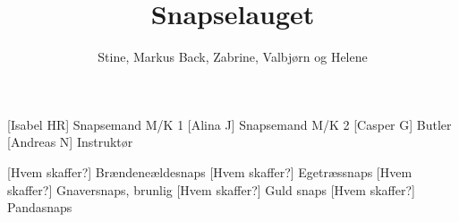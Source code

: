 \documentclass[a4paper,12pt]{article}
\title{Snapselauget}
\author{Stine, Markus Back, Zabrine, Valbjørn og Helene}
\begin{document}
\maketitle




\begin{roles}
	[Isabel HR] Snapsemand M/K 1
	[Alina J] Snapsemand M/K 2
	[Casper G] Butler
	[Andreas N] Instruktør
\end{roles}


\begin{props}
	[Hvem skaffer?] Brændeneældesnaps
	[Hvem skaffer?] Egetræssnaps
	[Hvem skaffer?] Gnaversnaps, brunlig
	[Hvem skaffer?] Guld snaps
	[Hvem skaffer?] Pandasnaps
\end{props}
\end{document}
